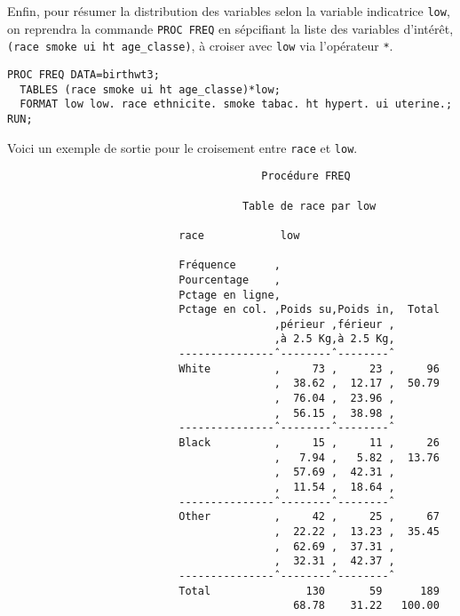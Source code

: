 Enfin, pour résumer la distribution des variables selon la variable
indicatrice \texttt{low}, on reprendra la commande \texttt{PROC FREQ} en
sépcifiant la liste des variables d'intérêt, 
\verb|(race smoke ui ht age_classe)|, à croiser avec \verb|low| via
l'opérateur \texttt{*}.
\begin{verbatim}
PROC FREQ DATA=birthwt3; 
  TABLES (race smoke ui ht age_classe)*low;
  FORMAT low low. race ethnicite. smoke tabac. ht hypert. ui uterine.;
RUN;
\end{verbatim}
Voici un exemple de sortie pour le croisement entre \texttt{race} et \texttt{low}.
\begin{verbatim}
                                        Procédure FREQ

                                     Table de race par low

                           race            low

                           Fréquence      ‚
                           Pourcentage    ‚
                           Pctage en ligne‚
                           Pctage en col. ‚Poids su‚Poids in‚  Total
                                          ‚périeur ‚férieur ‚
                                          ‚à 2.5 Kg‚à 2.5 Kg‚
                           ---------------ˆ--------ˆ--------ˆ
                           White          ‚     73 ‚     23 ‚     96
                                          ‚  38.62 ‚  12.17 ‚  50.79
                                          ‚  76.04 ‚  23.96 ‚
                                          ‚  56.15 ‚  38.98 ‚
                           ---------------ˆ--------ˆ--------ˆ
                           Black          ‚     15 ‚     11 ‚     26
                                          ‚   7.94 ‚   5.82 ‚  13.76
                                          ‚  57.69 ‚  42.31 ‚
                                          ‚  11.54 ‚  18.64 ‚
                           ---------------ˆ--------ˆ--------ˆ
                           Other          ‚     42 ‚     25 ‚     67
                                          ‚  22.22 ‚  13.23 ‚  35.45
                                          ‚  62.69 ‚  37.31 ‚
                                          ‚  32.31 ‚  42.37 ‚
                           ---------------ˆ--------ˆ--------ˆ
                           Total               130       59      189
                                             68.78    31.22   100.00
\end{verbatim}
\label{stop:sol8b}

